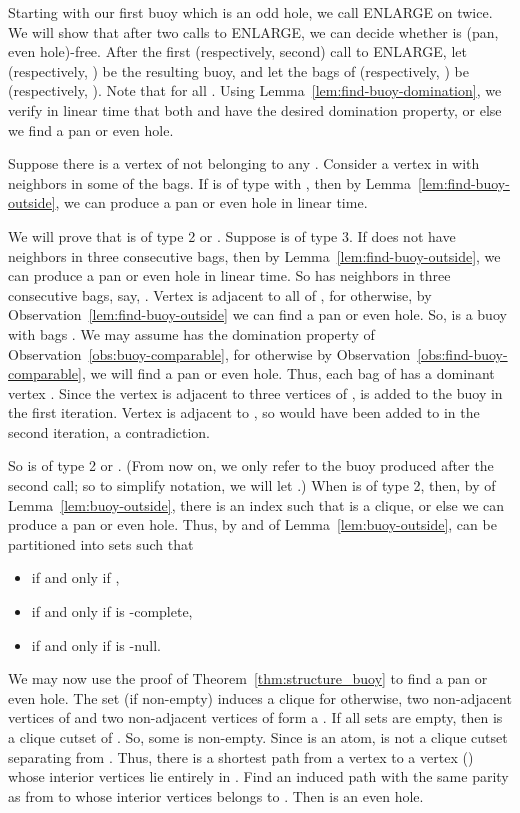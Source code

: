 \documentclass[11pt,a4paper]{article}
\newenvironment{proof}{\noindent {\it Proof:~}}{\hfill \smallskip\par}
\begin{document}
\begin{proof}
\begin{algorithm}
\begin{algorithmic}
\end{algorithmic}
\end{algorithm}


Starting with our first buoy  which is an odd hole, we call
ENLARGE on  twice. We will show that after two calls to
ENLARGE, we can decide whether  is (pan, even hole)-free. After
the first (respectively, second) call to ENLARGE, let 
(respectively, ) be the resulting buoy, and let the bags of
  (respectively, ) be  (respectively, ). Note
that  for all . Using
Lemma~\ref{lem:find-buoy-domination}, we verify in linear time
that both  and  have the desired domination property, or
else we find a pan or even hole.

Suppose there is a vertex of  not belonging to any .
Consider a vertex  in  with neighbors in some of the
bags. If  is of type  with , then
by Lemma~\ref{lem:find-buoy-outside}, we can produce a pan or even
hole in linear time.

We will prove that  is of type 2 or . Suppose  is of
type 3. If  does not have neighbors in three consecutive bags,
then by Lemma~\ref{lem:find-buoy-outside}, we can produce a pan or
even hole in linear time. So  has neighbors in three
consecutive bags, say, . Vertex 
is adjacent to all of  , for otherwise, by
Observation~\ref{lem:find-buoy-outside} we can find a pan or even
hole. So,  is a buoy with bags  . We may assume  has the domination property of
Observation~\ref{obs:buoy-comparable}, for otherwise by
Observation~\ref{obs:find-buoy-comparable}, we will find a pan or
even hole. Thus, each bag  of  has a dominant vertex
. Since the vertex  is adjacent to three vertices of
,  is added to the buoy  in the first iteration.
Vertex  is adjacent to , so  would have
been added to  in the second iteration, a contradiction.


So  is of type 2 or . (From now on, we only refer to the
buoy produced after the second call; so to simplify notation, we
will let .) When  is of type 2, then, by   of
Lemma~\ref{lem:buoy-outside}, there is an index  such that
 is a clique, or else we can produce
a pan or even hole.   Thus, by  and  of
Lemma~\ref{lem:buoy-outside},  can be partitioned into
sets  such that
\begin{itemize}
 \item  if and only if ,
 \item  if and only if  is -complete,
 \item  if and only if  is -null.
\end{itemize}
We may now use the proof of Theorem~\ref{thm:structure_buoy} to
find a pan or even hole. The set  (if non-empty) induces a
clique for otherwise,  two non-adjacent vertices of  and two
non-adjacent vertices of  form a . If all sets  are
empty, then  is a clique cutset of . So, some  is
non-empty. Since  is an atom,  is not
a clique cutset separating  from .
Thus, there is a shortest path  from a vertex  to
a vertex  () whose interior vertices lie
entirely in . Find an induced path  with the
same parity as  from  to  whose interior vertices
belongs to . Then  is an even hole.


\end{proof}
\end{document}
